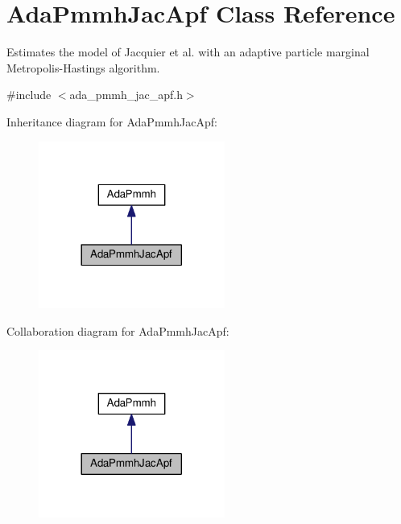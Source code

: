 \hypertarget{classAdaPmmhJacApf}{}\section{Ada\+Pmmh\+Jac\+Apf Class Reference}
\label{classAdaPmmhJacApf}


Estimates the model of Jacquier et al. with an adaptive particle marginal Metropolis-\/\+Hastings algorithm.  




{\ttfamily \#include $<$ada\+\_\+pmmh\+\_\+jac\+\_\+apf.\+h$>$}



Inheritance diagram for Ada\+Pmmh\+Jac\+Apf\+:
\nopagebreak
\begin{figure}[H]
\begin{center}
\leavevmode
\includegraphics[width=173pt]{classAdaPmmhJacApf__inherit__graph}
\end{center}
\end{figure}


Collaboration diagram for Ada\+Pmmh\+Jac\+Apf\+:
\nopagebreak
\begin{figure}[H]
\begin{center}
\leavevmode
\includegraphics[width=173pt]{classAdaPmmhJacApf__coll__graph}
\end{center}
\end{figure}
